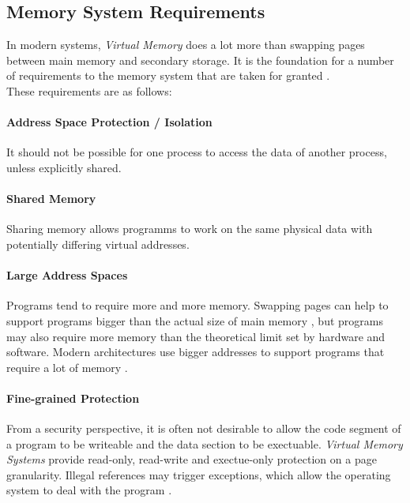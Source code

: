 \subsection{Memory System Requirements}
In modern systems, \textit{Virtual Memory} does a lot more than swapping pages between main memory and secondary
storage. It is the foundation for a number of requirements to the memory system that are taken for granted
\cite{jacobSoftwaremanagedAddressTranslation1997}.\\
These requirements are as follows:
\paragraph{Address Space Protection / Isolation} It should not be possible for one process to access the data
of another process, unless explicitly shared.
\cite{jacobVirtualMemoryContemporary1998}

\paragraph{Shared Memory} Sharing memory allows programms to work on the same physical data with potentially
differing virtual addresses.
\cite{jacobVirtualMemoryContemporary1998}

\paragraph{Large Address Spaces} Programs tend to require more and more memory. Swapping pages can help
to support programs bigger than the actual size of main memory \cite{tanenbaumOS}, but programs may
also require more memory than the theoretical limit set by hardware and software. Modern architectures
use bigger addresses to support programs that require a lot of memory \cite{jacobSoftwaremanagedAddressTranslation1997, jacobVirtualMemoryContemporary1998}.

\paragraph{Fine-grained Protection} From a security perspective, it is often not desirable to allow the code segment
of a program to be writeable and the data section to be exectuable. \textit{Virtual Memory Systems} provide read-only,
read-write and exectue-only protection on a page granularity\cite{jacobSoftwaremanagedAddressTranslation1997}.
Illegal references may trigger exceptions, which allow the operating system to deal with the program \cite{jacobVirtualMemoryContemporary1998}.

